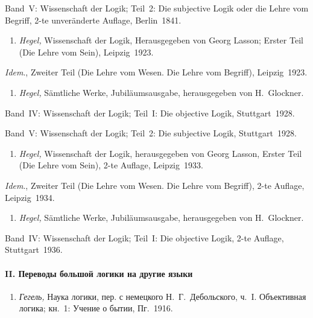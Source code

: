 Band~V: Wissen\-schaft der Logik; Teil~2: Die subjective Logik oder die Lehre
vom Begriff, 2-te unver\-änderte Auflage, Berlin~1841.

\begin{enumerate}
\item
{\em Hegel,} Wissen\-schaft der Logik, Heraus\-gegeben von Georg Lasson;
Erster Teil (Die Lehre vom Sein), Leipzig~1923.
\end{enumerate}

{\em Idem}., Zweiter Teil (Die Lehre vom Wesen. Die Lehre vom Begriff),
Leipzig~1923.

\begin{enumerate}
\item
{\em Hegel,} Sämtliche Werke, Jubiläums\-ausgabe, heraus\-gegeben von
H.~Glockner.
\end{enumerate}

Band~IV: Wissen\-schaft der Logik; Teil~I: Die objective Logik,
Stuttgart~1928.

Band~V: Wissen\-schaft der Logik; Teil~2: Die subjective Logik,
Stuttgart~1928.

\begin{enumerate}
\item
{\em Hegel,} Wissen\-schaft der Logik, heraus\-gegeben von Georg Lasson,
Erster Teil (Die Lehre vom Sein), 2-te Auflage, Leipzig~1933.
\end{enumerate}

{\em Idem}., Zweiter Teil (Die Lehre vom Wesen. Die Lehre vom Begriff),
2-te Auflage, Leipzig~1934.

\begin{enumerate}
\item
{\em Hegel,} Sämtliche Werke, Jubiläums\-ausgabe, heraus\-gegeben von
H.~Glockner.
\end{enumerate}

Band~IV: Wissen\-schaft der Logik; Teil~I: Die objective Logik, 2-te Auflage,
Stuttgart~1936.

\paragraph%
[II. Переводы большой логики на другие языки]%
{II. Переводы большой логики на другие языки}

\begin{enumerate}
\item
{\em Гегель,} Наука логики, пер. с немецкого Н.~Г.~Дебольского, ч.~I.
Объективная логика; кн.~1: Учение о бытии, Пг.~1916.
\end{enumerate}

